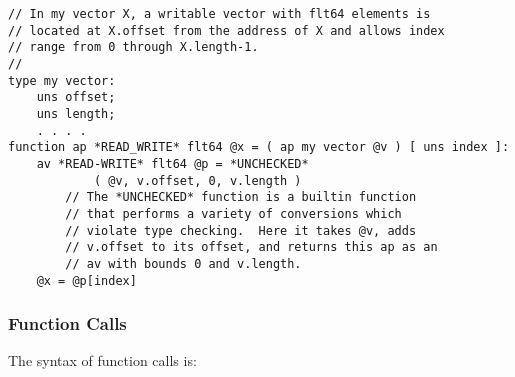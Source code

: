 \documentclass[12pt]{article}
\newenvironment{indpar}[1][0.3in]%
	{\begin{list}{}%
		     {\setlength{\itemsep}{0in}%
		      \setlength{\topsep}{0in}%
		      \setlength{\parsep}{1ex}%
		      \setlength{\labelwidth}{#1}%
		      \setlength{\leftmargin}{#1}%
		      \addtolength{\leftmargin}{\labelsep}}%
	 \item}%
	{\end{list}}
\begin{document}
\begin{indpar}\begin{verbatim}
// In my vector X, a writable vector with flt64 elements is
// located at X.offset from the address of X and allows index
// range from 0 through X.length-1.
//
type my vector:
    uns offset;
    uns length;
    . . . .
function ap *READ_WRITE* flt64 @x = ( ap my vector @v ) [ uns index ]:
    av *READ-WRITE* flt64 @p = *UNCHECKED*
            ( @v, v.offset, 0, v.length )
        // The *UNCHECKED* function is a builtin function
        // that performs a variety of conversions which
        // violate type checking.  Here it takes @v, adds
        // v.offset to its offset, and returns this ap as an
        // av with bounds 0 and v.length.
    @x = @p[index]
\end{verbatim}\end{indpar}

\subsubsection{Function Calls}
\label{FUNCTION-CALLS}

The syntax of function calls is:
\end{document}
